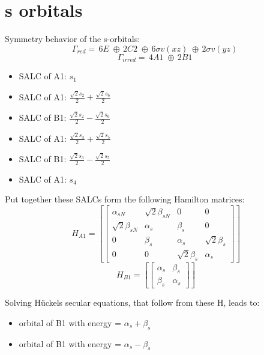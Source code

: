 \documentclass[12pt,a4paper]{article}
\begin{document}
\newpage \section*{s orbitals}
Symmetry behavior of the s-orbitals:
$$\Gamma_{red} = \,6 E\;\oplus{}\,2 C2\;\oplus{}\,6 \sigma v(xz)\;\oplus{}\,2 \sigma v(yz)\;$$
$$\Gamma_{irred} = \,4 A1\;\oplus{}\,2 B1\;$$


\begin{itemize}
\item SALC of A1: \quad $s_{1}$
\item SALC of A1: \quad $\frac{\sqrt{2} s_{2}}{2} + \frac{\sqrt{2} s_{6}}{2}$
\item SALC of B1: \quad $\frac{\sqrt{2} s_{2}}{2} - \frac{\sqrt{2} s_{6}}{2}$
\item SALC of A1: \quad $\frac{\sqrt{2} s_{3}}{2} + \frac{\sqrt{2} s_{5}}{2}$
\item SALC of B1: \quad $\frac{\sqrt{2} s_{3}}{2} - \frac{\sqrt{2} s_{5}}{2}$
\item SALC of A1: \quad $s_{4}$
\end{itemize}
Put together these SALCs form the following Hamilton matrices:
     $$ H_{A1}= \left[\begin{bmatrix}\alpha_{s N} & \sqrt{2} \beta_{s N} & 0 & 0\\\sqrt{2} \beta_{s N} & \alpha_{s} & \beta_{s} & 0\\0 & \beta_{s} & \alpha_{s} & \sqrt{2} \beta_{s}\\0 & 0 & \sqrt{2} \beta_{s} & \alpha_{s}\end{bmatrix}\right]$$ 
     $$ H_{B1}= \left[\begin{bmatrix}\alpha_{s} & \beta_{s}\\\beta_{s} & \alpha_{s}\end{bmatrix}\right]$$ 


Solving Hückels secular equations, that follow from these H, leads to:
\begin{itemize}
\item orbital of B1 with energy = $\alpha_{s} + \beta_{s}$
\item orbital of B1 with energy = $\alpha_{s} - \beta_{s}$
\end{itemize}
\end{document}
